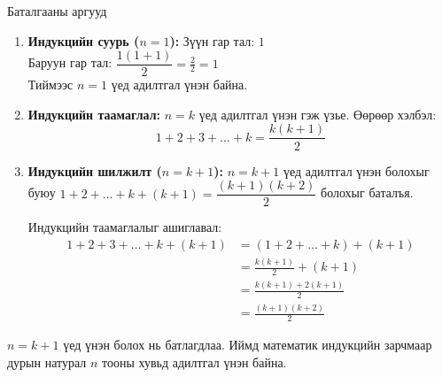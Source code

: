 \begin{frame}[allowframebreaks]{Баталгааны аргууд}
\begin{enumerate}
\begin{example}
\begin{prof}
\begin{enumerate}
    \item \textbf{Индукцийн суурь ($n=1$):} 
    Зүүн гар тал: $1$ \\
    Баруун гар тал: $\dfrac{1(1+1)}{2} = \frac{2}{2} = 1$ \\
    Тиймээс $n=1$ үед адилтгал үнэн байна.

    \item \textbf{Индукцийн таамаглал:} 
    $n=k$ үед адилтгал үнэн гэж үзье. Өөрөөр хэлбэл:
    \begin{equation}
    1 + 2 + 3 + \dots + k = \frac{k(k+1)}{2}
    \end{equation}

    \item \textbf{Индукцийн шилжилт ($n=k+1$):} 
    $n=k+1$ үед адилтгал үнэн болохыг буюу 
    $1 + 2 + \dots + k + (k+1) = \dfrac{(k+1)(k+2)}{2}$ болохыг баталъя.
    
    Индукцийн таамаглалыг ашиглавал:
    \begin{align*}
    1 + 2 + 3 + \dots + k + (k+1) &= (1 + 2 + \dots + k) + (k+1) \\
    &= \frac{k(k+1)}{2} + (k+1) \\
    &= \frac{k(k+1) + 2(k+1)}{2} \\
    &= \frac{(k+1)(k+2)}{2}
    \end{align*}
\end{enumerate}

$n=k+1$ үед үнэн болох нь батлагдлаа. Иймд математик индукцийн зарчмаар дурын натурал $n$ тооны хувьд адилтгал үнэн байна.
\end{prof}
\end{example}
\end{enumerate}
\end{frame}


